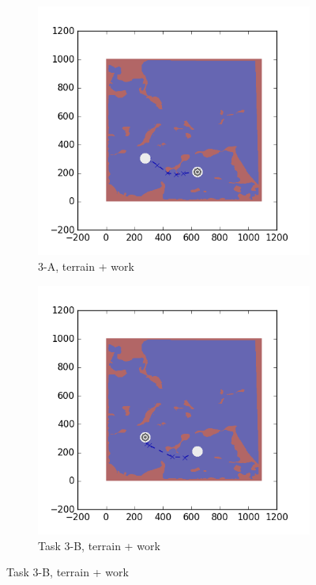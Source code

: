 \documentclass{tamuccthesis}
\begin{document}
\begin{figure}[H]
    \begin{subfigure}[b]{0.35\textwidth}  
        \centering
        \includegraphics[width=\textwidth,trim={4cm 3cm 2cm 3cm},clip]{EXP3RG_PathCa_-1_-1_-1_0.png}
        \caption{\small{3-A, terrain + work}}
        \label{fig:Path_3-A_terrain_work}
    \end{subfigure}
    \hfill
    \begin{subfigure}[b]{0.35\textwidth}  
        \centering 
        \includegraphics[width=\textwidth,trim={4cm 3cm 2cm 3cm},clip]{EXP3RG_PathCb_-1_-1_-1_0.png}
        \caption{\small{Task 3-B, terrain + work}}
        \label{fig:Path_3-B_terrain_work}
    \end{subfigure}


\end{figure}
\end{document}
